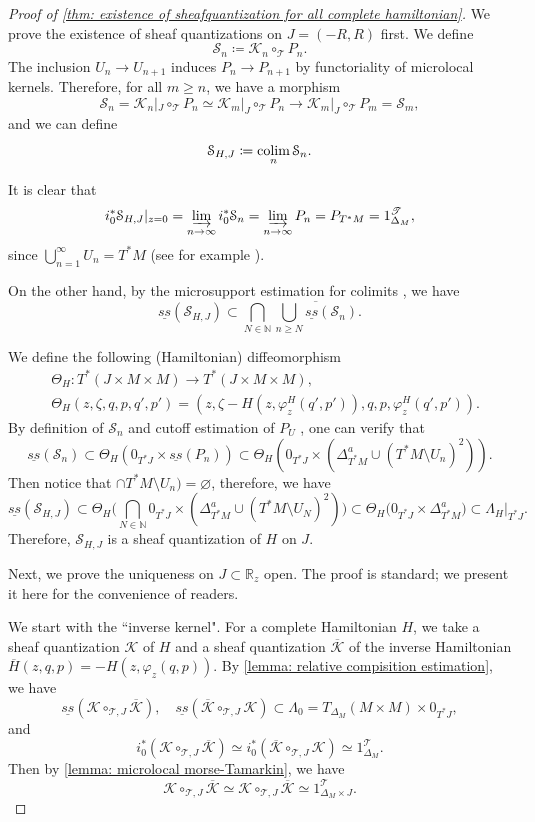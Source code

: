 \documentclass[11pt]{amsart}
\numberwithin{equation}{section}
\theoremstyle{plain}
\theoremstyle{definition}
\theoremstyle{remark}
\newcommand{\bR} { {\mathbb{R}}}
\newcommand{\bN} { {\mathbb{N}}}
\newcommand{\cK} { {\mathcal{K}}}
\newcommand{\cS} { {\mathcal{S}}}
\newcommand{\sT} { {\mathscr{T}}}
\newcommand{\colim}{\operatornamewithlimits{colim}}
\begin{document}
\begin{proof}[Proof of \autoref{thm: existence of sheafquantization for all complete hamiltonian}]

We prove the existence of sheaf quantizations on $J=(-R,R)$ first. 
We define
\[\cS_n\coloneqq \cK_n\circ_{\sT} P_n.\]
The inclusion $U_n\to U_{n+1}$ induces $P_{n}\to P_{n+1}$ by functoriality of microlocal kernels. Therefore, for all $m\geq n$, we have a morphism
\[\cS_n=\cK_n|_J\circ_{\sT} P_n\simeq \cK_{m}|_J\circ_{\sT} P_n \to \cK_{m}|_J\circ_{\sT} P_{m}=\cS_{m},\]
and we can define
\[\cS_{H,J} \coloneqq \colim_n \cS_n.\]

It is clear that \[i^*_0\cS_{H,J}|_{z=0}=\varinjlim_{n\to\infty} i^*_0\cS_n =\varinjlim_{n\to\infty} P_n=P_{T^*M}=1^\sT_{\Delta_M},\]
since $\bigcup_{n=1}^\infty U_n=T^*M$ (see for example \cite[Proposition 4.8]{zhang-cutoff}).

On the other hand, by the microsupport estimation for colimits \cite[Proposition 3.4]{guillermouviterbo_gammasupport}, we have
\[\underline{ss}(\cS_{H,J})\subset \bigcap_{N\in\bN} \overline{ \bigcup_{n\geq N}\underline{ss}(\cS_{n})}.\]

We define the following (Hamiltonian) diffeomorphism
\begin{align*}
&\Theta_H: T^*(J\times M\times M)\to T^*(J\times M\times M),\\
&\Theta_H(z,\zeta,q,p,q',p')=(z,\zeta-H(z,\varphi^H_z(q',p')),q,p,\varphi^H_z(q',p')).
\end{align*}
By definition of $\cS_n$ and cutoff estimation of $P_U$ \cite{zhang-cutoff}, one can verify that
\[\underline{ss}(\cS_{n})\subset \Theta_H(0_{T^*J}\times \underline{ss}( P_{n}))\subset \Theta_H(0_{T^*J}\times (\Delta^a_{T^*M}\cup (T^*M\setminus U_n)^2)).\]
Then notice that $\cap T^*M\setminus U_n)=\varnothing$, therefore, we have
\[\underline{ss}(\cS_{H,J})\subset  \Theta_H\Big( \bigcap _{N\in\bN} 0_{T^*J}\times (\Delta^a_{T^*M}\cup (T^*M\setminus U_N)^2)\Big)\subset \Theta_H\Big(  0_{T^*J}\times \Delta^a_{T^*M}\Big )\subset \Lambda_H |_{T^*J}.\]
Therefore, $\cS_{H,J}$ is a sheaf quantization of $H$ on $J$.  


Next, we prove the uniqueness on $J\subset \bR_z$ open. The proof is standard; we present it here for the convenience of readers.

We start with the ``inverse kernel". For a complete Hamiltonian $H$, we take a sheaf quantization $\cK$ of $H$ and a sheaf quantization $\overline{\cK}$ of the inverse Hamiltonian $\overline{H}(z,q,p)=-H(z,\varphi_z(q,p))$.
By \autoref{lemma: relative compisition estimation}, we have 
\[\underline{ss}(\cK\circ_{\sT,J} \overline{\cK}),\quad \underline{ss}(\overline{\cK}\circ_{\sT,J} \cK)\subset \Lambda_{0}=T_{\Delta_M}(M\times M)\times 0_{T^*J},\]
and
\[i^*_0(\cK\circ_{\sT,J} \overline{\cK})\simeq i^*_0(\overline{\cK}\circ_{\sT,J} \cK )\simeq 1^\sT_{\Delta_M}.\]
Then by \autoref{lemma: microlocal morse-Tamarkin}, we have
\begin{equation}\label{equatiuon:inverse kernel identity}
  \cK\circ_{\sT,J} \overline{\cK}\simeq \cK\circ_{\sT,J} \overline{\cK}\simeq 1^\sT_{\Delta_M\times J}.  
\end{equation}



\end{proof}
\end{document}
